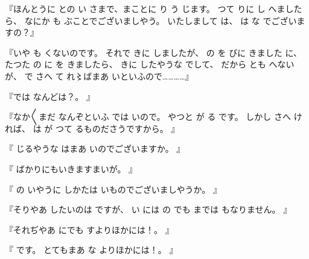 『ほんとうに
との
い
さまで、まことに
り
う
じます。
つて
りに
し
へましたら、
なにか
も
ぶことでございましやう。
いたしまして
は、
は
な
でございますの？』

『いや
も
くないのです。
それで
きに
しましたが、
の
を
びに
きました
に、たつた
の
に
を
きましたら、
きに
したやうな
でして、
だから
とも
へないが、
で
さへ
て
れ〻ばまあ
いといふので…………』

『では
なんどは？。
』

『なか〳〵まだ
なんぞといふ
では
いので。
やつと
が
る
です。
しかし
さへ
ければ、
は
が
つて
るものださうですから。
』

『
じるやうな
はまあ
いのでございますか。
』

『
ばかりにもいきますまいが。
』

『
の
いやうに
しかたは
いものでございましやうか。
』

『そりやあ
したいのは
ですが、
い
には
の
でも
までは
もなりません。
』

『それぢやあ
にでも
すよりほかには！。
』

『
です。
とてもまあ
な
よりほかには！。
』

